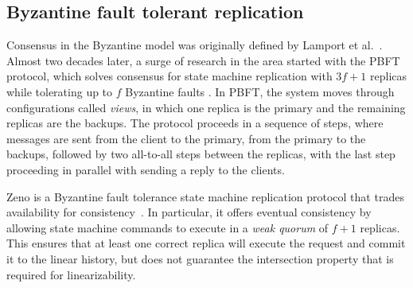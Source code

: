 \subsection{Byzantine fault tolerant replication} \label{Non-Crash}
Consensus in the Byzantine model was originally defined by Lamport et al.~\cite{LSP82}. Almost two decades later, a surge of research in the area started with the PBFT protocol, which solves consensus for state machine replication with $3f+1$ replicas while tolerating up to $f$ Byzantine faults \cite{CL99}. In PBFT, the system moves through configurations called \textit{views}, in which one replica is the primary and the remaining replicas are the backups. The protocol proceeds in a sequence of steps, where messages are sent from the client to the primary, from the primary to the backups, followed by two all-to-all steps between the replicas, with the last step proceeding in parallel with sending a reply to the clients. \par
Zeno is a Byzantine fault tolerance state machine replication protocol that trades availability for consistency~\cite{Singh2009}. In particular, it offers eventual consistency by allowing state machine commands to execute in a \textit{weak quorum} of  $f+1$ replicas. This ensures that at least one correct replica will execute the request and commit it to the linear history, but does not guarantee the intersection property that is required for linearizability. \par
